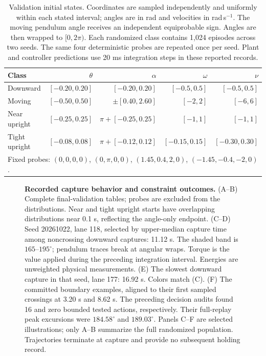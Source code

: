 \documentclass[letterpaper,10pt,conference]{ieeeconf}
\begin{document}
\begin{table}[t]
\centering\small
\caption{Validation initial states. Coordinates are sampled independently and uniformly within each stated interval; angles are in rad and velocities in rad\,s$^{-1}$. The moving pendulum angle receives an independent equiprobable sign. Angles are then wrapped to $[0,2\pi)$. Each randomized class contains 1,024 episodes across two seeds. The same four deterministic probes are repeated once per seed. Plant and controller predictions use 20 ms integration steps in these reported records.}
\label{tab:initial}
\begin{tabular}{lrrrr}
\toprule Class & $\theta$ & $\alpha$ & $\omega$ & $\nu$ \\
\midrule Downward & $[-0.20,0.20]$ & $[-0.20,0.20]$ & $[-0.5,0.5]$ & $[-0.5,0.5]$ \\
Moving & $[-0.50,0.50]$ & $\pm[0.40,2.60]$ & $[-2,2]$ & $[-6,6]$ \\
Near upright & $[-0.25,0.25]$ & $\pi+[-0.25,0.25]$ & $[-1,1]$ & $[-1,1]$ \\
Tight upright & $[-0.08,0.08]$ & $\pi+[-0.12,0.12]$ & $[-0.15,0.15]$ & $[-0.30,0.30]$ \\
\midrule
\multicolumn{5}{l}{Fixed probes: $(0,0,0,0)$, $(0,\pi,0,0)$, $(1.45,0.4,2,0)$, $(-1.45,-0.4,-2,0)$.}\\
\bottomrule
\end{tabular}
\end{table}

\begin{figure}[p]

\caption{\textbf{Recorded capture behavior and constraint outcomes.} (A--B) Complete final-validation tables; probes are excluded from the distributions. Near and tight upright starts have overlapping distributions near 0.1 s, reflecting the angle-only endpoint. (C--D) Seed 20261022, lane 118, selected by upper-median capture time among noncrossing downward captures: 11.12 s. The shaded band is $165$--$195^\circ$; pendulum traces break at angular wraps. Torque is the value applied during the preceding integration interval. Energies are unweighted physical measurements. (E) The slowest downward capture in that seed, lane 177: 16.92 s. Colors match (C). (F) The committed boundary examples, aligned to their first sampled crossings at 3.20 s and 8.62 s. The preceding decision audits found 16 and zero bounded tested actions, respectively. Their full-replay peak excursions were $184.58^\circ$ and $189.03^\circ$. Panels C--F are selected illustrations; only A--B summarize the full randomized population. Trajectories terminate at capture and provide no subsequent holding record.}
\label{fig:atlas}
\end{figure}
\end{document}
